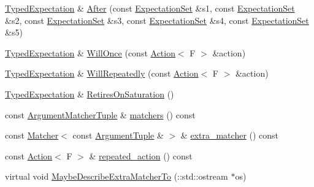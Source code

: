 \begin{DoxyCompactItemize}
\item 
\hyperlink{classtesting_1_1internal_1_1TypedExpectation}{Typed\+Expectation} \& \hyperlink{classtesting_1_1internal_1_1TypedExpectation_a72c0105b147ee2995d183c8e4109f6ca}{After} (const \hyperlink{classtesting_1_1ExpectationSet}{Expectation\+Set} \&s1, const \hyperlink{classtesting_1_1ExpectationSet}{Expectation\+Set} \&s2, const \hyperlink{classtesting_1_1ExpectationSet}{Expectation\+Set} \&s3, const \hyperlink{classtesting_1_1ExpectationSet}{Expectation\+Set} \&s4, const \hyperlink{classtesting_1_1ExpectationSet}{Expectation\+Set} \&s5)
\item 
\hyperlink{classtesting_1_1internal_1_1TypedExpectation}{Typed\+Expectation} \& \hyperlink{classtesting_1_1internal_1_1TypedExpectation_a41b0d15e44e95d52f4d5c310fb9e9683}{Will\+Once} (const \hyperlink{classtesting_1_1Action}{Action}$<$ F $>$ \&action)
\item 
\hyperlink{classtesting_1_1internal_1_1TypedExpectation}{Typed\+Expectation} \& \hyperlink{classtesting_1_1internal_1_1TypedExpectation_a73586c1adb458c5c431df9679e46f5f1}{Will\+Repeatedly} (const \hyperlink{classtesting_1_1Action}{Action}$<$ F $>$ \&action)
\item 
\hyperlink{classtesting_1_1internal_1_1TypedExpectation}{Typed\+Expectation} \& \hyperlink{classtesting_1_1internal_1_1TypedExpectation_ae7c42958a5d2c336ba7a42a871bf7709}{Retires\+On\+Saturation} ()
\item 
const \hyperlink{classtesting_1_1internal_1_1TypedExpectation_a8f10e3906761cc5c10fa3561c6e8938e}{Argument\+Matcher\+Tuple} \& \hyperlink{classtesting_1_1internal_1_1TypedExpectation_ad1a18c39511a2f6fda425881cddcc31a}{matchers} () const
\item 
const \hyperlink{classtesting_1_1Matcher}{Matcher}$<$ const \hyperlink{classtesting_1_1internal_1_1TypedExpectation_a9a91379262d101f435809ba4556d14fa}{Argument\+Tuple} \& $>$ \& \hyperlink{classtesting_1_1internal_1_1TypedExpectation_a0ee00342b872ae257cae31bc86b9a34b}{extra\+\_\+matcher} () const
\item 
const \hyperlink{classtesting_1_1Action}{Action}$<$ F $>$ \& \hyperlink{classtesting_1_1internal_1_1TypedExpectation_a2b32621ac4d71c1a71893eb0499f723d}{repeated\+\_\+action} () const
\item 
virtual void \hyperlink{classtesting_1_1internal_1_1TypedExpectation_ab019251041a408dc5a5d8ae216be53f4}{Maybe\+Describe\+Extra\+Matcher\+To} (\+::std\+::ostream $\ast$os)
\end{DoxyCompactItemize}
